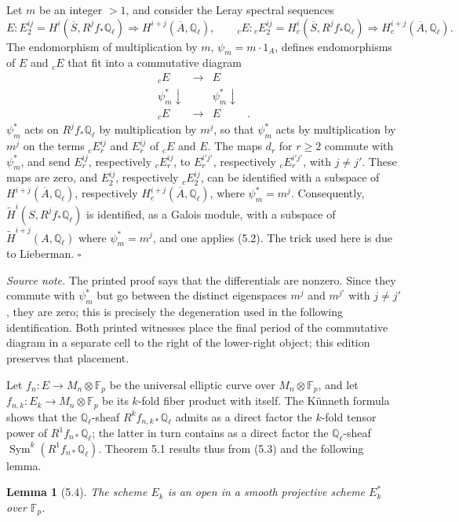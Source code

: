 \documentclass[10pt]{article}
\newcommand{\Q}{\mathbb Q}
\newcommand{\Sym}{\operatorname{Sym}}
\newcommand{\QED}{\hfill$\square$}
\newcommand{\F}{\mathbb F}
\newtheorem*{lemma}{Lemma}
\begin{document}
Let $m$ be an integer $>1$, and consider the Leray spectral sequences
\[
E:
E_2^{ij}=H^i(\overline S,R^jf_*\Q_\ell)\Longrightarrow H^{i+j}(\overline A,\Q_\ell),
\qquad
{}_cE:
{}_cE_2^{ij}=H_c^i(\overline S,R^jf_*\Q_\ell)\Longrightarrow H_c^{i+j}(\overline A,\Q_\ell).
\]
The endomorphism of multiplication by $m$, $\psi_m=m\cdot 1_A$, defines endomorphisms of $E$ and ${}_cE$ that fit into a commutative diagram
\[
\begin{array}{cccc}
{}_cE&\longrightarrow&E\\
\psi_m^*\downarrow&&\psi_m^*\downarrow\\
{}_cE&\longrightarrow&E&\text{.}
\end{array}
\]
$\psi_m^*$ acts on $R^jf_*\Q_\ell$ by multiplication by $m^j$, so that $\psi_m^*$ acts by multiplication by $m^j$ on the terms ${}_cE_r^{ij}$ and $E_r^{ij}$ of ${}_cE$ and $E$. The maps $d_r$ for $r\ge 2$ commute with $\psi_m^*$, and send $E_r^{ij}$, respectively ${}_cE_r^{ij}$, to $E_r^{i'j'}$, respectively ${}_cE_r^{i'j'}$, with $j\ne j'$. These maps are zero, and $E_2^{ij}$, respectively ${}_cE_2^{ij}$, can be identified with a subspace of $H^{i+j}(\overline A,\Q_\ell)$, respectively $H_c^{i+j}(\overline A,\Q_\ell)$, where $\psi_m^*=m^j$. Consequently, $\widetilde H^i(S,R^jf_*\Q_\ell)$ is identified, as a Galois module, with a subspace of $\widetilde H^{i+j}(A,\Q_\ell)$ where $\psi_m^*=m^j$, and one applies (5.2). The trick used here is due to Lieberman. \QED

\noindent\emph{Source note.} The printed proof says that the differentials are nonzero. Since they commute with $\psi_m^*$ but go between the distinct eigenspaces $m^j$ and $m^{j'}$ with $j\ne j'$, they are zero; this is precisely the degeneration used in the following identification. Both printed witnesses place the final period of the commutative diagram in a separate cell to the right of the lower-right object; this edition preserves that placement.

Let $f_n:E\to M_n\otimes\F_p$ be the universal elliptic curve over $M_n\otimes\F_p$, and let $f_{n,k}:E_k\to M_n\otimes\F_p$ be its $k$-fold fiber product with itself. The Künneth formula shows that the $\Q_\ell$-sheaf $R^kf_{n,k*}\Q_\ell$ admits as a direct factor the $k$-fold tensor power of $R^1f_{n*}\Q_\ell$; the latter in turn contains as a direct factor the $\Q_\ell$-sheaf $\Sym^k(R^1f_{n*}\Q_\ell)$. Theorem 5.1 results thus from (5.3) and the following lemma.

\begin{lemma}[5.4]
The scheme $E_k$ is an open in a smooth projective scheme $E_k^*$ over $\F_p$.
\end{lemma}
\end{document}

